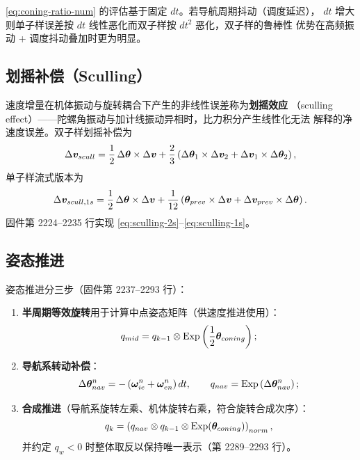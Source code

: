 \begin{remark}
\cref{eq:coning-ratio-num} 的评估基于固定 $dt$。若导航周期抖动（调度延迟），
$dt$ 增大则单子样误差按 $dt$ 线性恶化而双子样按 $dt^2$ 恶化，双子样的鲁棒性
优势在高频振动 + 调度抖动叠加时更为明显。
\end{remark}

\subsection{划摇补偿（Sculling）}

速度增量在机体振动与旋转耦合下产生的非线性误差称为\textbf{划摇效应}
（sculling effect）——陀螺角振动与加计线振动异相时，比力积分产生线性化无法
解释的净速度误差。双子样划摇补偿为
\begin{equation}
  \Delta\boldsymbol{v}_{scull} = \frac{1}{2}\,\Delta\boldsymbol{\theta}\times\Delta\boldsymbol{v}
    + \frac{2}{3}\left(\Delta\boldsymbol{\theta}_1\times\Delta\boldsymbol{v}_2
    + \Delta\boldsymbol{v}_1\times\Delta\boldsymbol{\theta}_2\right),
  \label{eq:sculling-2s}
\end{equation}
单子样流式版本为
\begin{equation}
  \Delta\boldsymbol{v}_{scull,1s} = \frac{1}{2}\,\Delta\boldsymbol{\theta}\times\Delta\boldsymbol{v}
    + \frac{1}{12}\left(\boldsymbol{\theta}_{prev}\times\Delta\boldsymbol{v}
    + \Delta\boldsymbol{v}_{prev}\times\Delta\boldsymbol{\theta}\right).
  \label{eq:sculling-1s}
\end{equation}
固件第 2224--2235 行实现 \cref{eq:sculling-2s}--\cref{eq:sculling-1s}。

\subsection{姿态推进}

姿态推进分三步（固件第 2237--2293 行）：
\begin{enumerate}
  \item \textbf{半周期等效旋转}用于计算中点姿态矩阵（供速度推进使用）：
    \begin{equation}
      q_{mid} = q_{k-1}\otimes\operatorname{Exp}\left(\frac{1}{2}\boldsymbol{\theta}_{coning}\right);
      \label{eq:quat-mid}
    \end{equation}
  \item \textbf{导航系转动补偿}：
    \begin{equation}
      \Delta\boldsymbol{\theta}_{nav}^n = -\left(\boldsymbol{\omega}_{ie}^n
        + \boldsymbol{\omega}_{en}^n\right)dt,
      \qquad
      q_{nav} = \operatorname{Exp}\left(\Delta\boldsymbol{\theta}_{nav}^n\right);
      \label{eq:nav-rotation}
    \end{equation}
  \item \textbf{合成推进}（导航系旋转左乘、机体旋转右乘，符合旋转合成次序）：
    \begin{equation}
      q_k = \left(q_{nav} \otimes q_{k-1} \otimes
        \operatorname{Exp}(\boldsymbol{\theta}_{coning})\right)_{norm},
      \label{eq:quat-propagate}
    \end{equation}
    并约定 $q_w < 0$ 时整体取反以保持唯一表示（第 2289--2293 行）。
\end{enumerate}

